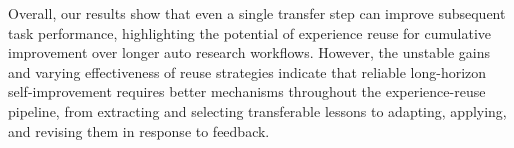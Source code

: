 Overall, our results show that even a single transfer step can improve subsequent task performance, highlighting the potential of experience reuse for cumulative improvement over longer auto research workflows.
However, the unstable gains and varying effectiveness of reuse strategies indicate that reliable long-horizon self-improvement requires better mechanisms throughout the experience-reuse pipeline, from extracting and selecting transferable lessons to adapting, applying, and revising them in response to feedback.
